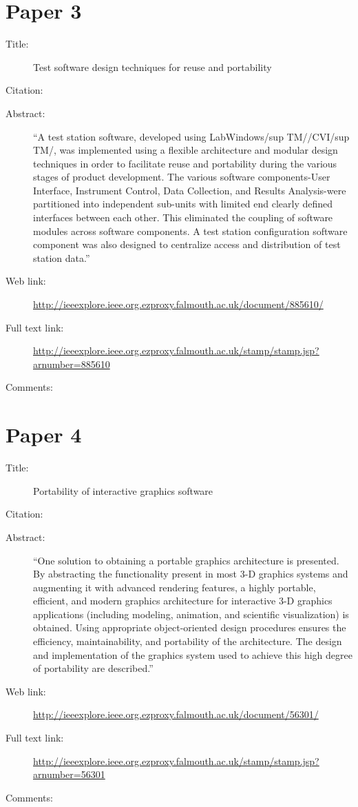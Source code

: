\documentclass{scrartcl}
\begin{document}
\section*{Paper 3}
\begin{description}
\item[Title:] Test software design techniques for reuse and portability
\item[Citation:] \cite{DeAbren}
\item[Abstract:] ``A test station software, developed using LabWindows/sup TM//CVI/sup TM/, was implemented using a flexible architecture and modular design techniques in order to facilitate reuse and portability during the various stages of product development. The various software components-User Interface, Instrument Control, Data Collection, and Results Analysis-were partitioned into independent sub-units with limited end clearly defined interfaces between each other. This eliminated the coupling of software modules across software components. A test station configuration software component was also designed to centralize access and distribution of test station data.''
\item[Web link:] \url{http://ieeexplore.ieee.org.ezproxy.falmouth.ac.uk/document/885610/}
\item[Full text link:]  \url{http://ieeexplore.ieee.org.ezproxy.falmouth.ac.uk/stamp/stamp.jsp?arnumber=885610}
\item[Comments:]
\end{description}

\section*{Paper 4}
\begin{description}
\item[Title:]Portability of interactive graphics software
\item[Citation:] \cite{Brittain}
\item[Abstract:] ``One solution to obtaining a portable graphics architecture is presented. By abstracting the functionality present in most 3-D graphics systems and augmenting it with advanced rendering features, a highly portable, efficient, and modern graphics architecture for interactive 3-D graphics applications (including modeling, animation, and scientific visualization) is obtained. Using appropriate object-oriented design procedures ensures the efficiency, maintainability, and portability of the architecture. The design and implementation of the graphics system used to achieve this high degree of portability are described.''
\item[Web link:] \url{http://ieeexplore.ieee.org.ezproxy.falmouth.ac.uk/document/56301/}
\item[Full text link:]  \url{http://ieeexplore.ieee.org.ezproxy.falmouth.ac.uk/stamp/stamp.jsp?arnumber=56301}
\item[Comments:]
\end{description}
\end{document}
